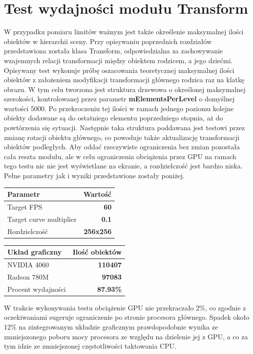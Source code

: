\section{Test wydajności modułu Transform}
W przypadku pomiaru limitów ważnym jest także określenie maksymalnej ilości obiektów w hierarchii sceny. Przy opisywaniu poprzednich rozdziałów przedstawiona została klasa Transform, odpowiedzialna za zachowywanie wzajemnych relacji transformacji między obiektem rodzicem, a jego dziećmi. Opisywany test wykonuje próbę oszacowania teoretycznej maksymalnej ilości obiektów z założeniem modyfikacji transformacji głównego rodzica raz na klatkę obrazu. W tym celu tworzona jest struktura drzewowa o określonej maksymalnej szerokości, kontrolowanej przez parametr \textbf{mElementsPerLevel} o domyślnej wartości 5000. Po przekroczeniu tej ilości w ramach jednego poziomu kolejne obiekty dodawane są do ostatniego elementu poprzedniego stopnia, aż do powtórzenia się sytuacji. Następnie taka struktura poddawana jest testowi przez zmianę rotacji obiektu głównego, co powoduje także aktualizację transformacji obiektów podległych. Aby oddać rzeczywiste ograniczenia bez zmian pozostała cała reszta modułu, ale w celu ograniczenia obciążenia przez GPU na ramach tego testu nic nie jest wyświetlane na ekranie, a rozdzielczość jest bardzo niska. Pełne parametry jak i wyniki przedstawione zostały poniżej.


\begin{center}
	\begin{tabular}{ |l r|}
		\hline
		\textbf{Parametr} & \textbf{Wartość} \\
		\hline
		Target FPS & \textbf{60} \\
		Target curve multiplier & \textbf{0.1} \\
		Rozdzielczość & \textbf{256x256} \\
		\hline
	\end{tabular}
	\quad
	\begin{tabular}{ |l r|}
		\hline
		\textbf{Układ graficzny} & \textbf{Ilość obiektów} \\
		\hline
		NVIDIA 4060 & \textbf{110407} \\
		Radeon 780M & \textbf{97083} \\
		\hline
		Procent wydajności & \textbf{87.93\%} \\
		\hline
	\end{tabular}
\end{center}


W trakcie wykonywania testu obciążenie GPU nie przekraczało 2\%, co zgodnie z oczekiwaniami sugeruje ograniczenie po stronie procesora głównego. Spadek około 12\% na zintegrowanym układzie graficznym prawdopodobnie wynika ze zmniejszonego poboru mocy procesora ze względu na dzielenie jej z GPU, a co za tym idzie ze zmniejszonej częstotliwości taktowania CPU.

